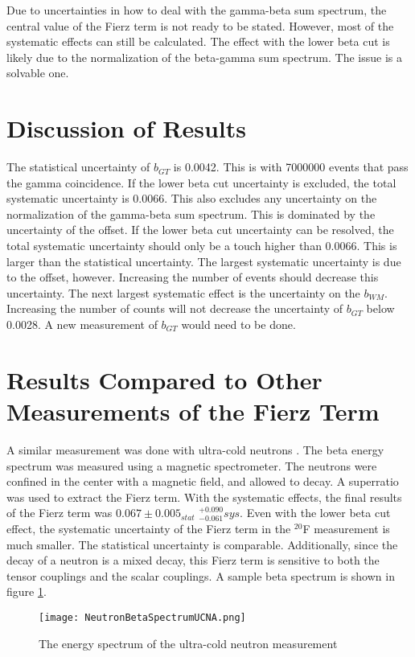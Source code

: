 \documentclass[../MaxHughesThesis.tex]{subfiles}
\begin{document}
Due to uncertainties in how to deal with the gamma-beta sum spectrum, the central value of the Fierz term is not ready to be stated. 
However, most of the systematic effects can still be calculated.
The effect with the lower beta cut is likely due to the normalization of the beta-gamma sum spectrum.
The issue is a solvable one. 

\section{Discussion of Results}

The statistical uncertainty of $b_{GT}$ is 0.0042.
This is with 7000000 events that pass the gamma coincidence.
If the lower beta cut uncertainty is excluded, the total systematic uncertainty is 0.0066.
This also excludes any uncertainty on the normalization of the gamma-beta sum spectrum.
This is dominated by the uncertainty of the offset.
If the lower beta cut uncertainty can be resolved, the total systematic uncertainty should only be a touch higher than 0.0066.
This is larger than the statistical uncertainty.
The largest systematic uncertainty is due to the offset, however.
Increasing the number of events should decrease this uncertainty.
The next largest systematic effect is the uncertainty on the $b_{WM}$.
Increasing the number of counts will not decrease the uncertainty of $b_{GT}$ below 0.0028.
A new measurement of $b_{GT}$ would need to be done.

\section{Results Compared to Other Measurements of the Fierz Term}

A similar measurement was done with ultra-cold neutrons \cite{Hic17}.
The beta energy spectrum was measured using a magnetic spectrometer.
The neutrons were confined in the center with a magnetic field, and allowed to decay.
A superratio was used to extract the Fierz term.
With the systematic effects, the final results of the Fierz term was $0.067 \pm 0.005_{stat}$ $ ^{+0.090}_{-0.061} sys$.
Even with the lower beta cut effect, the systematic uncertainty of the Fierz term in the $^{20}$F measurement is much smaller.
The statistical uncertainty is comparable. 
Additionally, since the decay of a neutron is a mixed decay, this Fierz term is sensitive to both the tensor couplings and the scalar couplings.  
A sample beta spectrum is shown in figure \ref{fig:ucnabeta}.

\begin{figure}[!htb]
	\centerline{\texttt{[image: NeutronBetaSpectrumUCNA.png]}}
	\caption{The energy spectrum of the ultra-cold neutron measurement \cite{Hic17}}
	\label{fig:ucnabeta}
\end{figure}
\end{document}
